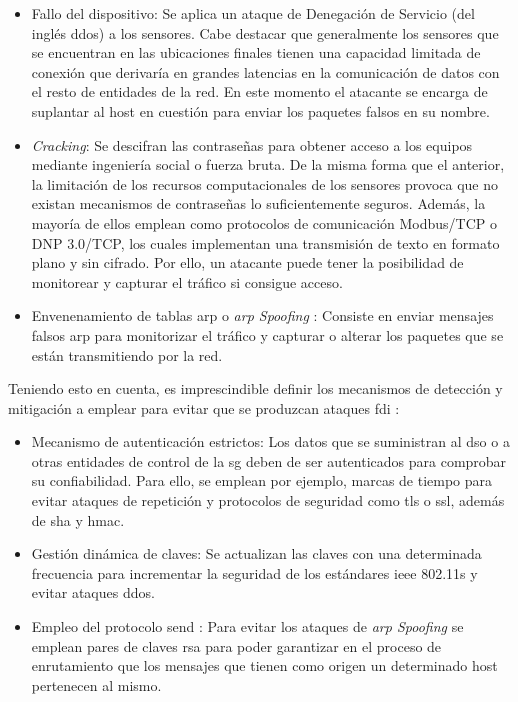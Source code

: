 \begin{itemize}
  \item Fallo del dispositivo: Se aplica un ataque de Denegación de Servicio (del inglés \gls{ddos}) a los sensores. Cabe destacar que generalmente los sensores que se encuentran en las ubicaciones finales tienen una capacidad limitada de conexión que derivaría en grandes latencias en la comunicación de datos con el resto de entidades de la red. En este momento el atacante se encarga de suplantar al host en cuestión para enviar los paquetes falsos en su nombre.
  \item \textit{Cracking}: Se descifran las contraseñas para obtener acceso a los equipos mediante ingeniería social o fuerza bruta. De la misma forma que el anterior, la limitación de los recursos computacionales de los sensores provoca que no existan mecanismos de contraseñas lo suficientemente seguros. Además, la mayoría de ellos emplean como protocolos de comunicación Modbus/TCP o DNP 3.0/TCP, los cuales implementan una transmisión de texto en formato plano y sin cifrado. Por ello, un atacante puede tener la posibilidad de monitorear y capturar el tráfico si consigue acceso.
  \item Envenenamiento de tablas \gls{arp} o \textit{\gls{arp} Spoofing} \cite{arp}: Consiste en enviar mensajes falsos \gls{arp} para monitorizar el tráfico y capturar o alterar los paquetes que se están transmitiendo por la red. 
\end{itemize}

Teniendo esto en cuenta, es imprescindible definir los mecanismos de detección y mitigación a emplear para evitar que se produzcan ataques \gls{fdi} \cite{baddata}:

\begin{itemize}
  \item Mecanismo de autenticación estrictos: Los datos que se suministran al \gls{dso} o a otras entidades de control de la \gls{sg} deben de ser autenticados para comprobar su confiabilidad. Para ello, se emplean por ejemplo, marcas de tiempo para evitar ataques de repetición y protocolos de seguridad como \gls{tls} o \gls{ssl}, además de \gls{sha} y \gls{hmac}.
  \item Gestión dinámica de claves: Se actualizan las claves con una determinada frecuencia para incrementar la seguridad de los estándares \gls{ieee} 802.11s y evitar ataques \gls{ddos}.
  \item Empleo del protocolo \gls{send} \cite{send}: Para evitar los ataques de \textit{\gls{arp} Spoofing} se emplean pares de claves \gls{rsa} para poder garantizar en el proceso de enrutamiento que los mensajes que tienen como origen un determinado host pertenecen al mismo.
\end{itemize}



